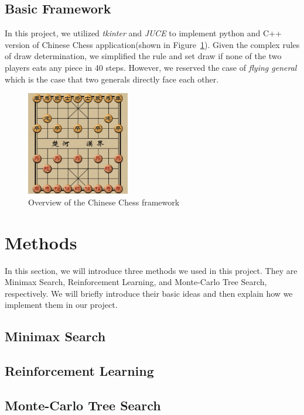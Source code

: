 \documentclass[letterpaper]{article}
\begin{document}
    \subsection{Basic Framework}\label{subsec:framework}
    In this project, we utilized \emph{tkinter} and \emph{JUCE} to implement python and C++ version of Chinese Chess application(shown in Figure~\ref{fig:figure}).
    Given the complex rules of draw determination, we simplified the rule and set draw if none of the two players eats any piece in 40 steps.
    However, we reserved the case of \emph{flying general} which is the case that two generals directly face each other.
    \begin{figure}
        \centering
        \includegraphics[width=0.4\textwidth]{img/overview}
        \caption{Overview of the Chinese Chess framework}\label{fig:figure}
    \end{figure}
    \section{Methods}\label{sec:methods}

In this section, we will introduce three methods we used in this project.
They are Minimax Search, Reinforcement Learning, and Monte-Carlo Tree Search, respectively.
We will briefly introduce their basic ideas and then explain how we implement them in our project.

\subsection{Minimax Search}\label{subsec:minimax-search}


\subsection{Reinforcement Learning}\label{subsec:reinforcement-learning}


\subsection{Monte-Carlo Tree Search}
\label{subsec:monte-carlo-tree-search}

\end{document}
